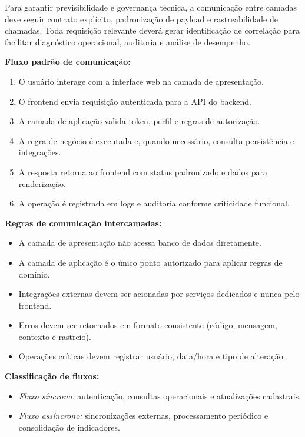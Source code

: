 \documentclass[12pt,a4paper]{article}
\begin{document}
Para garantir previsibilidade e governança técnica, a comunicação entre camadas deve seguir contrato explícito, padronização de payload e rastreabilidade de chamadas. Toda requisição relevante deverá gerar identificação de correlação para facilitar diagnóstico operacional, auditoria e análise de desempenho.

\textbf{Fluxo padrão de comunicação:}
\begin{enumerate}[leftmargin=*]
  \item O usuário interage com a interface web na camada de apresentação.
  \item O frontend envia requisição autenticada para a API do backend.
  \item A camada de aplicação valida token, perfil e regras de autorização.
  \item A regra de negócio é executada e, quando necessário, consulta persistência e integrações.
  \item A resposta retorna ao frontend com status padronizado e dados para renderização.
  \item A operação é registrada em logs e auditoria conforme criticidade funcional.
\end{enumerate}

\textbf{Regras de comunicação intercamadas:}
\begin{itemize}[leftmargin=*]
  \item A camada de apresentação não acessa banco de dados diretamente.
  \item A camada de aplicação é o único ponto autorizado para aplicar regras de domínio.
  \item Integrações externas devem ser acionadas por serviços dedicados e nunca pelo frontend.
  \item Erros devem ser retornados em formato consistente (código, mensagem, contexto e rastreio).
  \item Operações críticas devem registrar usuário, data/hora e tipo de alteração.
\end{itemize}

\textbf{Classificação de fluxos:}
\begin{itemize}[leftmargin=*]
  \item \textit{Fluxo síncrono:} autenticação, consultas operacionais e atualizações cadastrais.
  \item \textit{Fluxo assíncrono:} sincronizações externas, processamento periódico e consolidação de indicadores.
\end{itemize}
\end{document}
